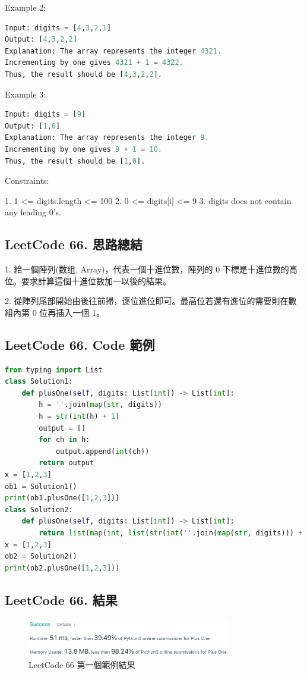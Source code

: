 \documentclass[10pt,UTF8]{ctexart}
\begin{document}
Example 2:
\begin{lstlisting}[language={python}]
Input: digits = [4,3,2,1]
Output: [4,3,2,2]
Explanation: The array represents the integer 4321.
Incrementing by one gives 4321 + 1 = 4322.
Thus, the result should be [4,3,2,2].
\end{lstlisting}

Example 3:
\begin{lstlisting}[language={python}]
Input: digits = [9]
Output: [1,0]
Explanation: The array represents the integer 9.
Incrementing by one gives 9 + 1 = 10.
Thus, the result should be [1,0].
\end{lstlisting}

Constraints:

1. 1 <= digits.length <= 100
2. 0 <= digits[i] <= 9
3.  digits does not contain any leading 0's.

\subsection{LeetCode 66. 思路總結}

1. 給一個陣列(数组, Array)，代表一個十進位數，陣列的 0 下標是十進位數的高位。要求計算這個十進位數加一以後的結果。

2. 從陣列尾部開始由後往前掃，逐位進位即可。最高位若還有進位的需要則在數組內第 0 位再插入一個 1。

\subsection{LeetCode 66. Code 範例}

\begin{lstlisting}[language={python}]
from typing import List
class Solution1:
    def plusOne(self, digits: List[int]) -> List[int]:
        h = ''.join(map(str, digits))
        h = str(int(h) + 1)
        output = []
        for ch in h:
            output.append(int(ch))
        return output
x = [1,2,3]
ob1 = Solution1()
print(ob1.plusOne([1,2,3]))
class Solution2:
    def plusOne(self, digits: List[int]) -> List[int]:
        return list(map(int, list(str(int(''.join(map(str, digits))) + 1))))
x = [1,2,3]
ob2 = Solution2()
print(ob2.plusOne([1,2,3]))
\end{lstlisting}

\subsection{LeetCode 66. 結果}

\begin{figure}[H]
\centering 
\includegraphics[width=0.80\textwidth]{lc-66-1.png} 
\caption{LeetCode 66 第一個範例結果}
\label{Test}
\end{figure}
\end{document}
